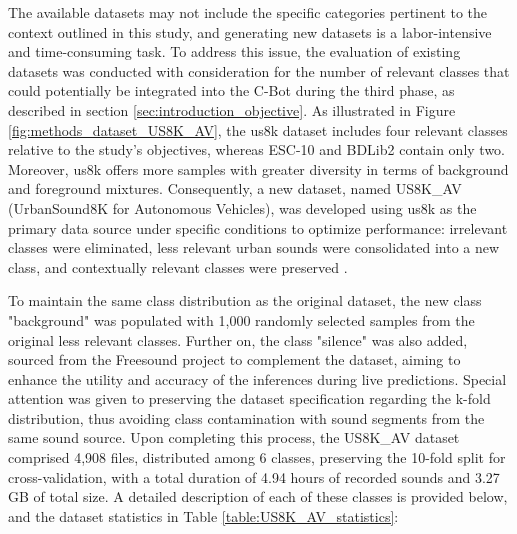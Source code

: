 The available datasets may not include the specific categories pertinent to the context outlined in this study, and generating new datasets is a labor-intensive and time-consuming task. To address this issue, the evaluation of existing datasets was conducted with consideration for the number of relevant classes that could potentially be integrated into the C-Bot during the third phase, as described in section \ref{sec:introduction_objective}. As illustrated in Figure \ref{fig:methods_dataset_US8K_AV}, the \gls{us8k} dataset includes four relevant classes relative to the study's objectives, whereas ESC-10 and BDLib2 contain only two. Moreover, \gls{us8k} offers more samples with greater diversity in terms of background and foreground mixtures. Consequently, a new dataset, named US8K\_AV (UrbanSound8K for Autonomous Vehicles), was developed using \gls{us8k} as the primary data source under specific conditions to optimize performance: irrelevant classes were eliminated, less relevant urban sounds were consolidated into a new class, and contextually relevant classes were preserved \cite{florentino2024}.

To maintain the same class distribution as the original dataset, the new class "background" was populated with 1,000 randomly selected samples from the original less relevant classes. Further on, the class "silence" was also added, sourced from the Freesound project \cite{Font_freesound2013} to complement the dataset, aiming to enhance the utility and accuracy of the inferences during live predictions. Special attention was given to preserving the dataset specification regarding the k-fold distribution, thus avoiding class contamination with sound segments from the same sound source. Upon completing this process, the US8K\_AV dataset comprised 4,908 files, distributed among 6 classes, preserving the 10-fold split for cross-validation, with a total duration of 4.94 hours of recorded sounds and 3.27 GB of total size. A detailed description of each of these classes is provided below, and the dataset statistics in Table \ref{table:US8K_AV_statistics}:

